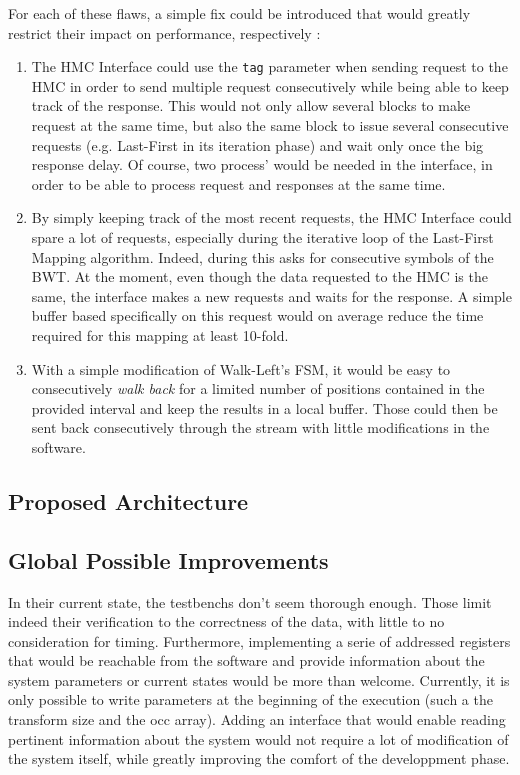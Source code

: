 For each of these flaws, a simple fix could be introduced that would greatly restrict their impact on performance, respectively :

\begin{enumerate}
    \item The HMC Interface could use the \texttt{tag} parameter when sending request to the HMC in order to send multiple request consecutively while being able to keep track of the response. This would not only allow several blocks to make request at the same time, but also the same block to issue several consecutive requests (e.g. Last-First in its iteration phase) and wait only once the big response delay. Of course, two process' would be needed in the interface, in order to be able to process request and responses at the same time.
    \item By simply keeping track of the most recent requests, the HMC Interface could spare a lot of requests, especially during the iterative loop of the Last-First Mapping algorithm. Indeed, during this asks for consecutive symbols of the BWT. At the moment, even though the data requested to the HMC is the same, the interface makes a new requests and waits for the response. A simple buffer based specifically on this request would on average reduce the time required for this mapping at least 10-fold.
    \item With a simple modification of Walk-Left's FSM, it would be easy to consecutively \textit{walk back} for a limited number of positions contained in the provided interval and keep the results in a local buffer. Those could then be sent back consecutively through the stream with little modifications in the software.
\end{enumerate}

\subsection{Proposed Architecture}

\subsection{Global Possible Improvements}

In their current state, the testbenchs don't seem thorough enough. Those limit indeed their verification to the correctness of the data, with little to no consideration for timing. Furthermore, implementing a serie of addressed registers that would be reachable from the software and provide information about the system parameters or current states would be more than welcome. Currently, it is only possible to write parameters at the beginning of the execution (such a the transform size and the occ array). Adding an interface that would enable reading pertinent information about the system would not require a lot of modification of the system itself, while greatly improving the comfort of the developpment phase. \\



